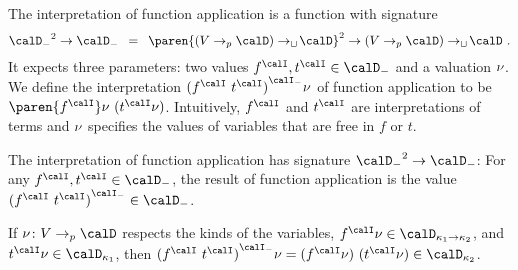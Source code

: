 \documentclass[../../diss.tex]{subfiles}
\begin{document}
The interpretation of function application is a function with signature
\[
    {\domaint}^2 \to \domaint
    \enspace
    =
    \enspace
    {\paren{(V \pto \domain) \cto \domain}}^2 \to (V \pto \domain) \cto \domain
    \ .
\]
It expects three parameters: two values $f^\interpretation,  t^\interpretation \in \domaint$ and a valuation $\nu$.
We define the interpretation ${(f^\interpretation \appl t^\interpretation)}^\interpretationt \val$ of function application to be $\paren{f^\interpretation} \val \appl (t^\interpretation \val)$.
Intuitively, $f^\interpretation$ and $t^\interpretation$ are interpretations of terms and $\nu$ specifies the values of variables that are free in $f$ or $t$.

\begin{lemma}
    The interpretation of function application has signature ${\domaint}^2 \to \domaint$:
    For any $f^\interpretation, t^\interpretation \in \domaint$, the result of function application is the value ${(f^\interpretation \appl t^\interpretation)}^\interpretationt \in \domaint$.

    If $\val \colon V \pto \domain$ respects the kinds of the variables, $f^\interpretation \val \in \domain{\kappa_1 \to \kappa_2}$, and $t^\interpretation \val \in \domain{\kappa_1}$, then ${(f^\interpretation \appl t^\interpretation)}^\interpretationt \val = (f^\interpretation \val) \appl (t^\interpretation \val) \in \domain{\kappa_2}$.
\end{lemma}
\end{document}
